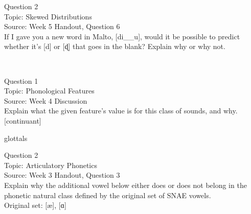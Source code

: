 \documentclass[12pt]{article}
\begin{document}
\newpage

{\large Question 2}\\

Topic: Skewed Distributions\\
Source: Week 5 Handout, Question 6\\

If I gave you a new word in Malto, [di\_\_u], would it be possible to predict whether it's [d] or [ɖ] that goes in the blank? Explain why or why not.\\


\newpage

\begin{center}
\textbf{{\color{red}{\HUGE END OF EXAM}}}\\

\end{center}
\newpage

\begin{center}
\textbf{{\color{blue}{\HUGE START OF EXAM\\}}}

\textbf{{\color{blue}{\HUGE Student ID: 68935\\}}}

\textbf{{\color{blue}{\HUGE 4:00\\}}}

\end{center}
\newpage

{\large Question 1}\\

Topic: Phonological Features\\
Source: Week 4 Discussion\\

Explain what the given feature’s value is for this class of sounds, and why.\\

{[continuant]}

glottals


\newpage

{\large Question 2}\\

Topic: Articulatory Phonetics\\
Source: Week 3 Handout, Question 3\\

Explain why the additional vowel below either does or does not belong in the phonetic natural class defined by the original set of SNAE vowels.\\

Original set: {[æ]}, {[ɑ]}
\end{document}
